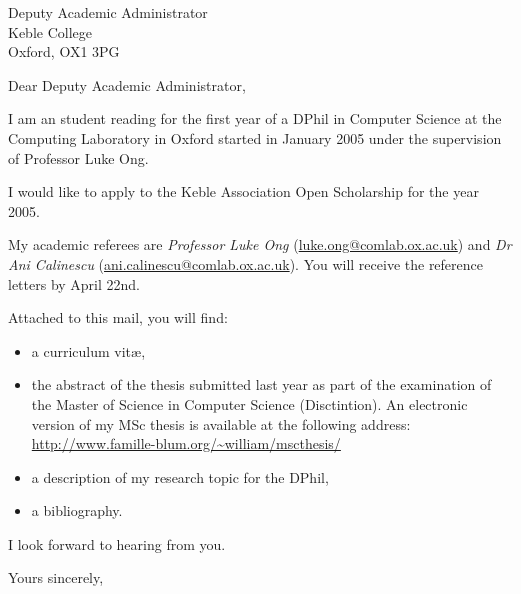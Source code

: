 \documentclass{letter}
\begin{document}
\address{William Blum \\ Linacre College\\ Oxford, OX1 3JA\\ william.blum@comlab.ox.ac.uk}
\signature{William Blum}
\begin{letter}{Deputy Academic Administrator\\ Keble College\\ Oxford, OX1 3PG }
\opening{Dear Deputy Academic Administrator,}

I am an student reading for the first year of a DPhil in Computer
Science at the Computing Laboratory in Oxford started in January
2005 under the supervision of Professor Luke Ong.

I would like to apply to the Keble Association Open Scholarship for
the year 2005.


My academic referees are \textsl{Professor Luke Ong}
(\url{luke.ong@comlab.ox.ac.uk}) and \textsl{Dr Ani Calinescu}
(\url{ani.calinescu@comlab.ox.ac.uk}). You will receive the
reference letters by April 22nd.

Attached to this mail, you will find:
\begin{itemize}
\item a curriculum vit\ae,
\item the abstract of the thesis submitted last year as part of the examination of the Master of Science in Computer Science (Disctintion). An electronic version of my MSc thesis is available at the following address: \url{http://www.famille-blum.org/~william/mscthesis/}
\item a description of my research topic for the DPhil,
\item a bibliography.
\end{itemize}

I look forward to hearing from you.

\closing{Yours sincerely,}
\end{letter}
\end{document}
